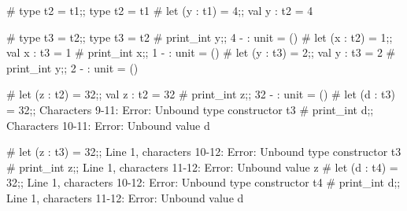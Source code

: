 \begin{ocaml}
# type t2 = t1;;
type t2 = t1
# let (y : t1) = 4;;
val y : t2 = 4
\end{ocaml}

\begin{ocaml}
# type t3 = t2;;
type t3 = t2
# print_int y;;
4
- : unit = ()
# let (x : t2) = 1;;
val x : t3 = 1
# print_int x;;
1
- : unit = ()
# let (y : t3) = 2;;
val y : t3 = 2
# print_int y;;
2
- : unit = ()
\end{ocaml}

\begin{ocaml}
# let (z : t2) = 32;;
val z : t2 = 32
# print_int z;;
32
- : unit = ()
# let (d : t3) = 32;;
Characters 9-11:
Error: Unbound type constructor t3
# print_int d;;
Characters 10-11:
Error: Unbound value d
\end{ocaml}

\begin{ocaml}
# let (z : t3) = 32;;
Line 1, characters 10-12:
Error: Unbound type constructor t3
# print_int z;;
Line 1, characters 11-12:
Error: Unbound value z
# let (d : t4) = 32;;
Line 1, characters 10-12:
Error: Unbound type constructor t4
# print_int d;;
Line 1, characters 11-12:
Error: Unbound value d
\end{ocaml}
